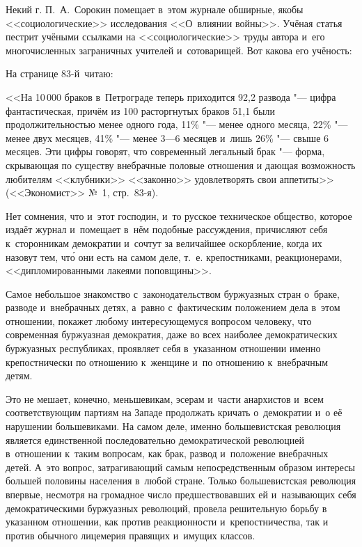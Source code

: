 Некий г. П.~А.~Сорокин помещает в~этом журнале обширные, якобы
<<социологические>> исследования <<О~влиянии войны>>. Учёная статья
пестрит учёными ссылками на <<социологические>> труды автора и~его
многочисленных заграничных учителей и~сотоварищей. Вот какова его учёность:

На странице 83-й~читаю:

\medskip
{\small
<<На 10\,000 браков в~Петрограде теперь приходится 92,2 развода "--- цифра
фантастическая, причём из 100 расторгнутых браков 51,1 были
продолжительностью менее одного года, 11\% "--- менее одного месяца,
22\% "--- менее двух месяцев, 41\% "--- менее 3---6 месяцев и~лишь
26\% "--- свыше 6 месяцев. Эти цифры говорят, что современный легальный
брак "--- форма, скрывающая по существу внебрачные половые отношения и
дающая возможность любителям <<клубники>> <<законно>> удовлетворять свои
аппетиты>> (<<Экономист>> №~1, стр.~83-я).}
\medskip

Нет сомнения, что и~этот господин, и~то русское техническое общество,
которое издаёт журнал и~помещает в~нём подобные рассуждения, причисляют
себя к~сторонникам демократии и~сочтут за величайшее оскорбление, когда их
назовут тем, чт\'{о} они есть на самом деле, т.~е. крепостниками,
реакционерами, <<дипломированными лакеями поповщины>>.

Самое небольшое знакомство с~законодательством буржуазных стран о~браке,
разводе и~внебрачных детях, а~равно с~фактическим положением дела в~этом
отношении, покажет любому интересующемуся вопросом человеку, что
современная буржуазная демократия, даже во всех наиболее демократических
буржуазных республиках, проявляет себя в~указанном отношении именно
крепостнически по отношению к~женщине и~по отношению к~внебрачным детям.

Это не мешает, конечно, меньшевикам, эсерам и~части анархистов и~всем
соответствующим партиям на Западе продолжать кричать о~демократии и~о её
нарушении большевиками. На самом деле, именно большевистская революция
является единственной последовательно демократической революцией в~отношении
к~таким вопросам, как брак, развод и~положение внебрачных детей. А~это
вопрос, затрагивающий самым непосредственным образом интересы большей
половины населения в~любой стране. Только большевистская революция впервые,
несмотря на громадное число предшествовавших ей и~называющих себя
демократическими буржуазных революций, провела решительную борьбу в
указанном отношении, как против реакционности и~крепостничества, так и
против обычного лицемерия правящих и~имущих классов.

